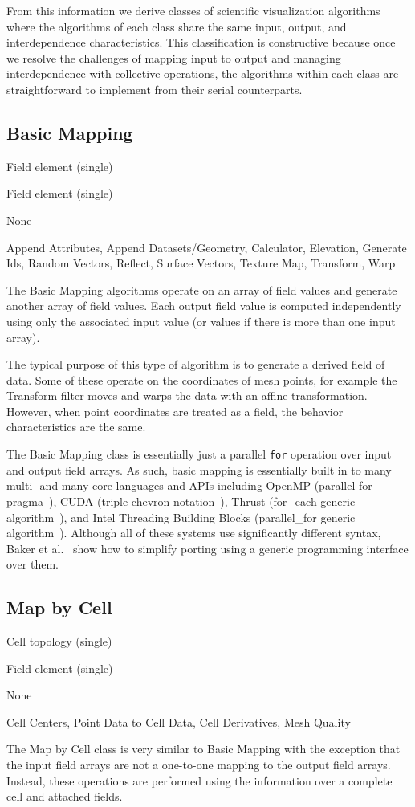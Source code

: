 \documentclass{sig-alternate}
\newcommand*{\lcite}[1]{~\cite{#1}}
\newcommand*{\scite}[1]{~\cite{#1}}
\newcommand{\etal}{et al.}
\newcommand{\algclass}[1]{\textsf{#1}}
\newcommand{\alg}[1]{#1}
\newcommand{\algorithmclasssection}[1]{\subsection*{#1}}
\newcommand{\algorithmclass}[5]{
  \algorithmclasssection{#1} %
  \begin{description}[leftmargin=9em,style=nextline,noitemsep]
    \raggedright
  \item[Input] #2
  \item[Output] #3
  \item[Interdependence] #4
  \item[Algorithms] #5
  \end{description}
}
\begin{document}
From this information we derive classes of scientific visualization
algorithms where the algorithms of each class share the same input,
output, and interdependence characteristics. This classification is
constructive because once we resolve the challenges of mapping input to
output and managing interdependence with collective operations, the
algorithms within each class are straightforward to implement from their
serial counterparts.

\algorithmclass{Basic Mapping}
               {Field element (single)} %
               {Field element (single)} %
               {None} %
               {Append Attributes, Append Datasets/Geometry, Calculator,
                 Elevation, Generate Ids, Random Vectors, Reflect, Surface
                 Vectors, Texture Map, Transform, Warp}

\noindent
The \algclass{Basic Mapping} algorithms operate on an array of field values
and generate another array of field values. Each output field value is
computed independently using only the associated input value (or values if
there is more than one input array).

The typical purpose of this type of algorithm is to generate a derived
field of data. Some of these operate on the coordinates of mesh points, for
example the \alg{Transform} filter moves and warps the data with an affine
transformation. However, when point coordinates are treated as a field, the
behavior characteristics are the same.

The \algclass{Basic Mapping} class is essentially just a parallel
\texttt{for} operation over input and output field arrays. As such, basic
mapping is essentially built in to many multi- and many-core languages and
APIs including OpenMP (parallel for pragma\lcite{Quinn2004}), CUDA (triple
chevron notation\lcite{Sanders2011}), Thrust (for\_each generic
algorithm\lcite{Thrust}), and Intel Threading Building Blocks
(parallel\_for generic algorithm\lcite{TBB}). Although all of these systems
use significantly different syntax, Baker \etal\scite{Baker2010} show how
to simplify porting using a generic programming interface over them.


\algorithmclass{Map by Cell}
               {Cell topology (single)} %
               {Field element (single)} %
               {None} %
               {Cell Centers, Point Data to Cell Data, Cell Derivatives,
                 Mesh Quality}

\noindent
The \algclass{Map by Cell} class is very similar to \algclass{Basic
  Mapping} with the exception that the input field arrays are not a
one-to-one mapping to the output field arrays. Instead, these operations
are performed using the information over a complete cell and attached
fields.
\end{document}
